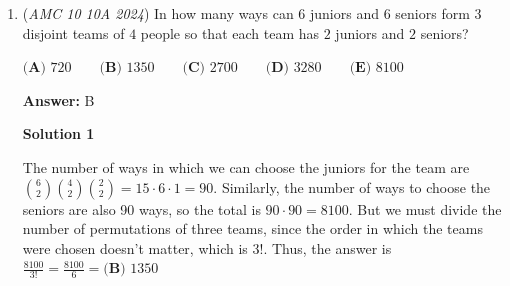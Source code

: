 \begin{enumerate}
 The total amount of time worked is $1$ hour and $45$ minutes, which when converted to minutes, is $105$ minutes. This means that since Amy, Bomani, and Charlie worked for the entire $105$ minutes, they in total packed $\dfrac{105}{3}\cdot10=350$ packages.

 Since $450$ packages were packed in total, then Daria must have packed $450-350=100$ packages in total, and since she packs at a rate of $5$ packages per $4$ minutes, then Daria worked for $\dfrac{100}{5}\cdot4=80$ minutes, therefore Daria joined $80$ minutes before $2:45$ PM, which was at $\boxed{\textbf{(A) }1:25\text{ PM}}$.

 



\textbf{Solution 2}

Let the time, in minutes, elapsed between $1:00$ and the time Daria joined the packaging be $x$. Since Amy packages $4$ packages every $3$ minutes, she packages $\frac{4}{3}$ packages per minute. Similarly, we can see that both Bomani and Charlie package $1$ package per minute, and Daria packages $\frac{5}{4}$ packages every minute.

 Before Daria arrives, we can write the total packages packaged as $x(\frac{4}{3} + 1 + 1) = x(\frac{10}{3})$. Since there are $105$ minutes between $1:00$ and $2:45$, Daria works with the other three for $105-x$ minutes, meaning for that time there are $(105-x)(\frac{4}{3} + 1 + 1 + \frac{5}{4}) = (105-x)(\frac{55}{12})$ packages packaged. 

 Adding the two, we get $x(\frac{10}{3}) + (105-x)(\frac{55}{12}) = 450$ (The total packaged in the entire time is $450$). Solving this equation, we get $x=25$, meaning Daria arrived $25$ minutes after $1:00$, meaning the answer is $\boxed{\textbf{(A) }1:25\text{ PM}}$.

 


	\item (\textit{AMC 10 10A 2024}) In how many ways can $6$ juniors and $6$ seniors form $3$ disjoint teams of $4$ people so 
that each team has $2$ juniors and $2$ seniors? 


 $\textbf{(A) }720\qquad\textbf{(B) }1350\qquad\textbf{(C) }2700\qquad\textbf{(D) }3280\qquad\textbf{(E) }8100$

 \textbf{Answer: }B



\textbf{Solution 1}

The number of ways in which we can choose the juniors for the team are ${6\choose2}{4\choose2}{2\choose2}=15\cdot6\cdot1=90$. Similarly, the number of ways to choose the seniors are also 90 ways, so the total is $90\cdot90=8100$. But we must divide the number of permutations of three teams, since the order in which the teams were chosen doesn't matter, which is $3!$. Thus, the answer is $\frac{8100}{3!}=\frac{8100}{6}=\boxed{\textbf{(B) }1350}$





\end{enumerate}
